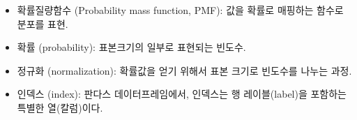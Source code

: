 \begin{itemize}

\item 확률질량함수 (Probability mass function, PMF): 값을 확률로 매핑하는 함수로 분포를 표현.

\item 확률 (probability): 
표본크기의 일부로 표현되는 빈도수.

\item 정규화 (normalization): 
확률값을 얻기 위해서 표본 크기로 빈도수를 나누는 과정.

\item 인덱스 (index): 
판다스 데이터프레임에서, 인덱스는 행 레이블(label)을 포함하는 특별한 열(칼럼)이다.

\end{itemize}
